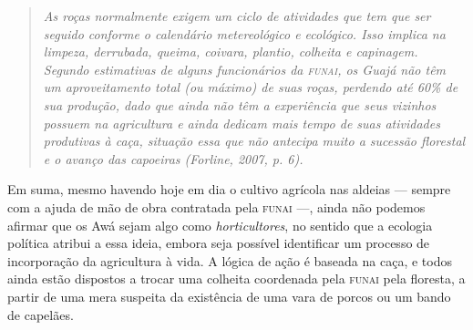 \begin{quote}
\emph{As roças normalmente exigem um ciclo de atividades que tem que ser
seguido conforme o calendário metereológico e ecológico. Isso implica na
limpeza, derrubada, queima, coivara, plantio, colheita e capinagem.
Segundo estimativas de alguns funcionários da \textsc{funai}, os Guajá não têm um
aproveitamento total (ou máximo) de suas roças, perdendo até 60\% de sua
produção, dado que ainda não têm a experiência que seus vizinhos possuem
na agricultura e ainda dedicam mais tempo de suas atividades produtivas
à caça, situação essa que não antecipa muito a sucessão florestal e o
avanço das capoeiras (Forline, 2007, p. 6).}
\end{quote}

Em suma, mesmo havendo hoje em dia o cultivo agrícola nas aldeias ---
sempre com a ajuda de mão de obra contratada pela \textsc{funai} ---, ainda não
podemos afirmar que os Awá sejam algo como \emph{horticultores}, no
sentido que a ecologia política atribui a essa ideia, embora seja
possível identificar um processo de incorporação da agricultura à vida.
A lógica de ação é baseada na caça, e todos ainda estão dispostos a
trocar uma colheita coordenada pela \textsc{funai} pela floresta, a partir de uma
mera suspeita da existência de uma vara de porcos ou um bando de
capelães.

